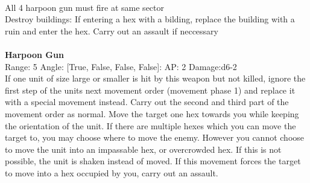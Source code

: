 \ \\
All 4 harpoon gun must fire at same sector\\ 
Destroy buildings: If entering a hex with a bilding, replace the building with a ruin and enter the hex. Carry out an assault if neccessary\\ 

\ \\
{\bf Harpoon Gun } \\



Range: 5  Angle: [True, False, False, False]: AP: 2 Damage:d6-2 \\
If one unit of size large or smaller is hit by this weapon but not killed, ignore the first step of the units next movement order (movement phase 1) and replace it with a special movement instead. Carry out the second and third part of the movement order as normal. Move the target one hex towards you while keeping the orientation of the unit. If there are multiple hexes which you can move the target to, you may choose where to move the enemy. However you cannot choose to move the unit into an impassable hex, or overcrowded hex. If this is not possible, the unit is shaken instead of moved. If this movement forces the target to move into a hex occupied by you, carry out an assault.\\ 




 
\ \\



